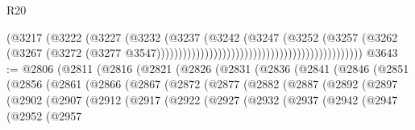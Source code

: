 \begin{lexlean}{R20}
\begin{coremodule}
                                                                        (@3217
                                                                          (@3222
                                                                            (@3227
                                                                              (@3232
                                                                                (@3237
                                                                                  (@3242
                                                                                    (@3247
                                                                                      (@3252
                                                                                        (@3257
                                                                                          (@3262
                                                                                            (@3267
                                                                                              (@3272
                                                                                                (@3277
                                                                                                  @3547)))))))))))))))))))))))))))))))))))))))))))))))
@3643 := @2806
    (@2811
      (@2816
        (@2821
          (@2826
            (@2831
              (@2836
                (@2841
                  (@2846
                    (@2851
                      (@2856
                        (@2861
                          (@2866
                            (@2867
                              (@2872
                                (@2877
                                  (@2882
                                    (@2887
                                      (@2892
                                        (@2897
                                          (@2902
                                            (@2907
                                              (@2912
                                                (@2917
                                                  (@2922
                                                    (@2927
                                                      (@2932
                                                        (@2937
                                                          (@2942
                                                            (@2947
                                                              (@2952
                                                                (@2957

\end{coremodule}
\end{lexlean}
